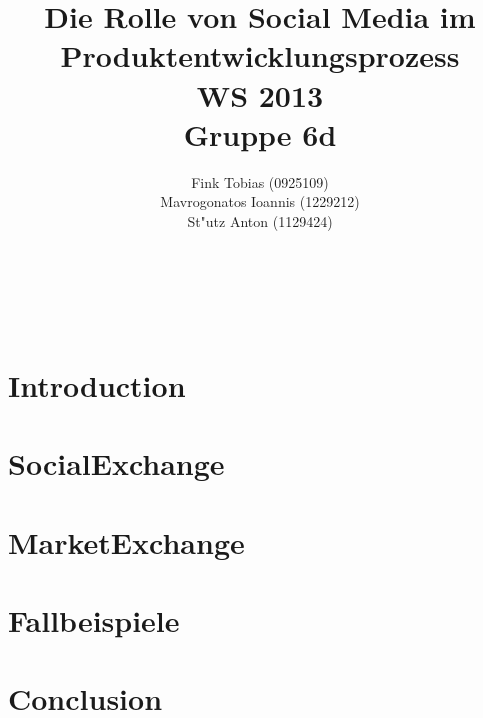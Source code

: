 \documentclass[a4paper, 12pt]{article} %
\title{\textbf{Die Rolle von Social Media im Produktentwicklungsprozess
}\\ %
WS 2013\\\vspace{5pt}
Gruppe 6d} %
\author{Fink Tobias (0925109)\\
 Mavrogonatos Ioannis (1229212)\\
 St"utz Anton (1129424)\\
 \vspace{10pt}
\textbf{}
\\{\textit{}}} %
\makeatletter
\renewcommand{\maketitle}{ %
\begin{flushright} %
{\LARGE\@title} %

\vspace{50pt} %

{\large\@author} %
\\ \vspace{10pt}\@date %

\vspace{40pt} %
\end{flushright}
}
\makeatother
\begin{document}
\maketitle %

\newpage

\tableofcontents

\newpage



\section{Introduction}


\section{SocialExchange}


\section{MarketExchange}


\section{Fallbeispiele}


\section{Conclusion}






\end{document}
